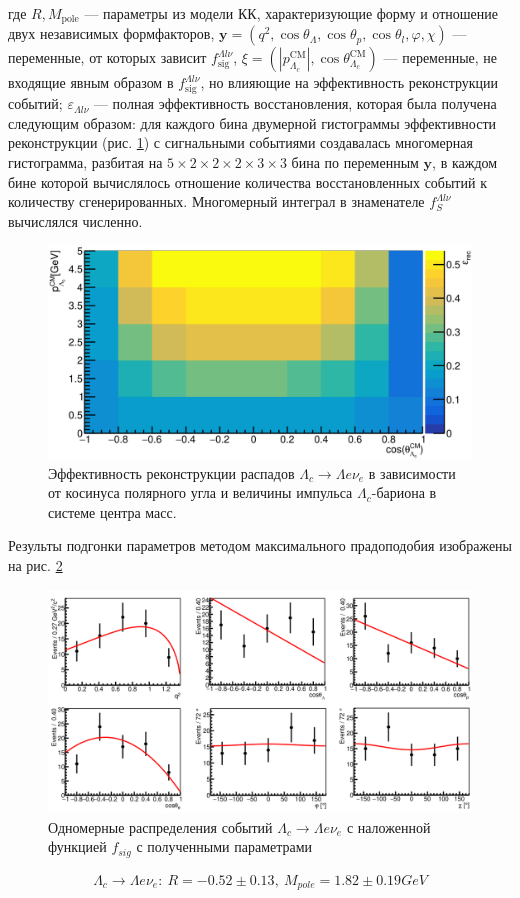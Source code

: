 где $ R, M_{\text{pole}} $ --- параметры из модели $КК$, характеризующие форму 
и отношение двух независимых формфакторов, 
$\mathbf{y} = (q^2, \cos\theta_\Lambda, \cos\theta_p, \cos\theta_l, \varphi, \chi)$ 
--- переменные, от которых зависит $ f_{\text{sig}}^{\Lambda l \nu} $, 
$ \xi = (|p_{\Lambda_c}^{\text{CM}}|, \cos\theta_{\Lambda_c}^{\text{CM}}) $ --- 
переменные, не входящие явным образом в $ f_{\text{sig}}^{\Lambda l \nu} $, 
но влияющие на эффективность реконструкции событий; 
$\varepsilon_{\Lambda l \nu} $ --- полная эффективность восстановления, 
которая была получена следующим образом: для каждого бина двумерной гистограммы 
эффективности реконструкции (рис. \ref{l_l_nu:rec}) с сигнальными событиями 
создавалась многомерная гистограмма, разбитая на 
$ 5 \times 2 \times 2 \times 2 \times 3 \times 3 $ бина по переменным 
$ \mathbf{y} $, в каждом бине которой вычислялось отношение количества восстановленных событий к количеству 
сгенерированных. Многомерный интеграл в знаменателе $ f_S^{\Lambda l \nu} $ вычислялся численно.

\begin{figure}[H]
    \centering
    \includegraphics[width=1\linewidth]{img/l_l_nu_rec.png}
    \caption{Эффективность реконструкции распадов $\Lambda_c \to \Lambda e \nu_e$ в зависимости от
    косинуса полярного угла и величины импульса $\Lambda_c$-бариона в системе центра масс.}
    \label{l_l_nu:rec}
\end{figure}


Результы подгонки параметров методом максимального прадоподобия изображены на рис. \ref{l_l_nu:fit}


\begin{figure}[H]
    \centering
    \includegraphics[width=1\linewidth]{img/l_l_nu_fit.png}
    \caption{Одномерные распределения событий $\Lambda_c \to \Lambda e \nu_e$ с наложенной
    функцией $f_{sig}$ с полученными параметрами}
    \label{l_l_nu:fit}
\end{figure}

\begin{eqnarray}
    \Lambda_c \to \Lambda e \nu_e: \ R = -0.52 \pm 0.13,\ M_{pole} = 1.82 ± 0.19 GeV
\end{eqnarray}



